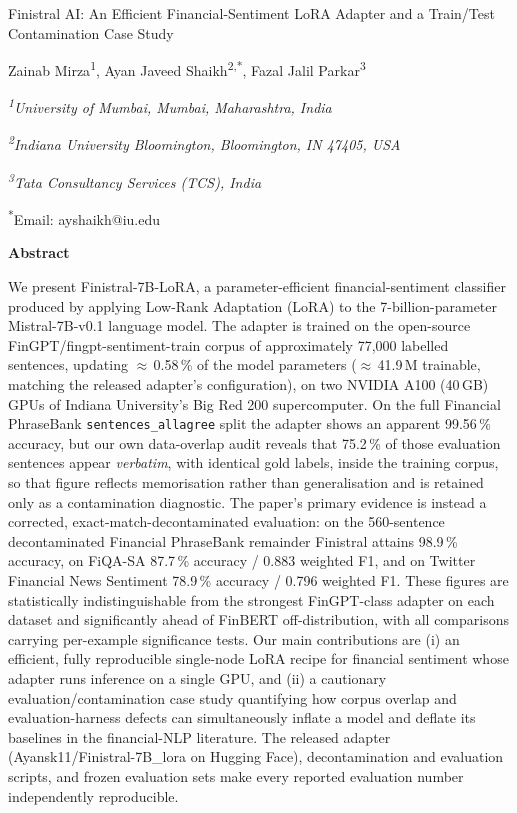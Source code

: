 \documentclass[a4paper]{article}
\newcommand{\calibrifont}{\fontfamily{Crlt-LF}\selectfont}
\newcommand{\grtitle}[1]{%
  {\calibrifont\fontsize{20}{24}\selectfont\bfseries\raggedright #1\par}%
  \vspace{6pt}%
}
\newcommand{\grauthor}[1]{%
  {\fontsize{10}{12}\selectfont #1\par}%
}
\newcommand{\graffiliation}[1]{%
  {\fontsize{9}{11}\selectfont\itshape #1\par}%
}
\newcommand{\gremail}[1]{%
  {\fontsize{9}{11}\selectfont #1\par}%
}
\newcommand{\grabstractheading}{%
  \vspace{12pt}%
  {\calibrifont\fontsize{12}{14.4}\selectfont\bfseries Abstract\par}%
  \vspace{4pt}%
}
\newenvironment{grabstract}{%
  \calibrifont\fontsize{10.5}{12.6}\selectfont\singlespacing
}{\par\vspace{6pt}}
\begin{document}
\grtitle{Finistral AI: An Efficient Financial-Sentiment LoRA Adapter and a Train/Test Contamination Case Study}

\grauthor{Zainab Mirza\textsuperscript{1}, Ayan Javeed Shaikh\textsuperscript{2,*}, Fazal Jalil Parkar\textsuperscript{3}}

\vspace{4pt}
\graffiliation{\textsuperscript{1}University of Mumbai, Mumbai, Maharashtra, India}
\graffiliation{\textsuperscript{2}Indiana University Bloomington, Bloomington, IN 47405, USA}
\graffiliation{\textsuperscript{3}Tata Consultancy Services (TCS), India}

\vspace{2pt}
\gremail{\textsuperscript{*}Email: ayshaikh@iu.edu}

\grabstractheading
\begin{grabstract}
We present Finistral-7B-LoRA, a parameter-efficient financial-sentiment classifier produced by applying Low-Rank Adaptation (LoRA) to the 7-billion-parameter Mistral-7B-v0.1 language model. The adapter is trained on the open-source FinGPT/fingpt-sentiment-train corpus of approximately 77,000 labelled sentences, updating $\approx$\,0.58\,\% of the model parameters ($\approx$\,41.9\,M trainable, matching the released adapter's configuration), on two NVIDIA A100 (40\,GB) GPUs of Indiana University's Big Red 200 supercomputer. On the full Financial PhraseBank \texttt{sentences\_allagree} split the adapter shows an apparent 99.56\,\% accuracy, but our own data-overlap audit reveals that 75.2\,\% of those evaluation sentences appear \emph{verbatim}, with identical gold labels, inside the training corpus, so that figure reflects memorisation rather than generalisation and is retained only as a contamination diagnostic. The paper's primary evidence is instead a corrected, exact-match-decontaminated evaluation: on the 560-sentence decontaminated Financial PhraseBank remainder Finistral attains 98.9\,\% accuracy, on FiQA-SA 87.7\,\% accuracy / 0.883 weighted F1, and on Twitter Financial News Sentiment 78.9\,\% accuracy / 0.796 weighted F1. These figures are statistically indistinguishable from the strongest FinGPT-class adapter on each dataset and significantly ahead of FinBERT off-distribution, with all comparisons carrying per-example significance tests. Our main contributions are (i) an efficient, fully reproducible single-node LoRA recipe for financial sentiment whose adapter runs inference on a single GPU, and (ii) a cautionary evaluation/contamination case study quantifying how corpus overlap and evaluation-harness defects can simultaneously inflate a model and deflate its baselines in the financial-NLP literature. The released adapter (Ayansk11/Finistral-7B\_lora on Hugging Face), decontamination and evaluation scripts, and frozen evaluation sets make every reported evaluation number independently reproducible.
\end{grabstract}
\end{document}

